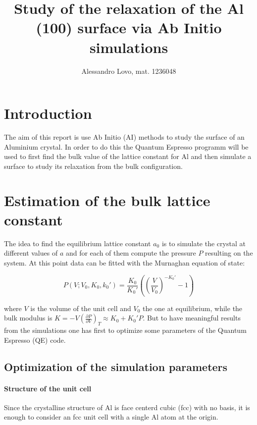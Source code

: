 \documentclass[a4paper, 11pt]{article}
\begin{document}
\title{Study of the relaxation of the Al (100) surface via Ab Initio simulations}
\author{Alessandro Lovo, mat. 1236048}

\maketitle

\section{Introduction}
  The aim of this report is use Ab Initio (AI) methods to study the surface of an Aluminium crystal. In order to do this the Quantum Espresso \cite{rif:QE} programm will be used to first find the bulk value of the lattice constant for Al and then simulate a surface to study its relaxation from the bulk configuration.

\section{Estimation of the bulk lattice constant}
  The idea to find the equilibrium lattice constant $a_0$ is to simulate the crystal at different values of $a$ and for each of them compute the pressure $P$ resulting on the system. At this point data can be fitted with the Murnaghan equation of state:

  \begin{equation*}
    P(V;V_0,K_0,k_0') = \frac{K_0}{K_0'}\left(\left(\frac{V}{V_0} \right)^{-K_0'} - 1 \right)
  \end{equation*}

  where $V$ is the volume of the unit cell and $V_0$ the one at equilibrium, while the bulk modulus is $K = -V \left(\frac{\partial P}{\partial V}\right)_T \approx K_0 + K_0'P$.
  But to have meaningful results from the simulations one has first to optimize some parameters of the Quantum Espresso (QE) code.

  \subsection{Optimization of the simulation parameters}
    \paragraph{Structure of the unit cell}
      Since the crystalline structure of Al is face centerd cubic (fcc) with no basis, it is enough to consider an fcc unit cell with a single Al atom at the origin.
\end{document}

